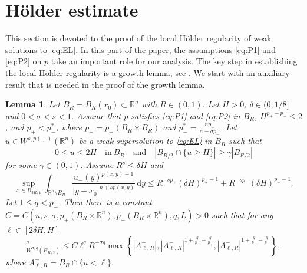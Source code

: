\documentclass[11pt]{amsart}
\theoremstyle{plain}
\newtheorem{lemma}[theorem]{Lemma}
\theoremstyle{definition}
\numberwithin{equation}{section}
\begin{document}
\section{H\"older estimate} \label{sec:Holder}
This section is devoted to the proof of the local H\"older regularity of weak solutions to \eqref{eq:EL}. In this part of the paper, the assumptions \eqref{eq:P1} and \eqref{eq:P2} on $p$ take an important role for our analysis. The key step in establishing the local H\"older regularity is a growth lemma, see . We start with an auxiliary result that is needed in the proof of the growth lemma. 
\begin{lemma} \label{lemma:ellest}
Let $B_R = B_R(x_0) \subset \mathbb{R}^n$ with $R \in (0,1)$. Let $H > 0$, $\delta\in(0,1/8]$ and $0<\sigma < s <1$. Assume that $p$ satisfies \eqref{eq:P1} and \eqref{eq:P2} in $B_R$, $H^{p_+ - p_-} \leq 2$, and $p_+ < p_-^\ast$, where $p_\pm = p_\pm(B_R \times B_R)$ and $p_-^\ast = \frac{np_-}{n-\sigma p_-}$. Let $u \in W^{s, p(\cdot,\cdot)}(\mathbb{R}^n)$ be a weak supersolution to \eqref{eq:EL} in $B_R$ such that
\begin{equation} \label{eq:assumption1}
0 \leq u \leq 2H \quad\text{in}~ B_R \quad\text{and}\quad |B_{R/2} \cap \lbrace u \geq H \rbrace| \geq \gamma |B_{R/2}|
\end{equation}
for some $\gamma \in (0,1)$. Assume $R^s \leq \delta H$ and
\begin{equation} \label{eq:assumption_tail2}
\sup_{x \in B_{3R/4}} \int_{\mathbb{R}^n \setminus B_R} \frac{u_-(y)^{p(x,y)-1}}{|y-x_0|^{n+sp(x,y)}} \,\mathrm{d}y \leq R^{-sp_+} (\delta H)^{p_+-1} + R^{-sp_-} (\delta H)^{p_--1}.
\end{equation}
Let $1 \leq q < p_- $.
Then there is a constant $C=C(n, s, \sigma, p_+(B_R \times \mathbb{R}^n), p_-(B_R \times \mathbb{R}^n), q, L) > 0$ such that for any $\ell\in[2\delta H,  H]$
\begin{equation*}
[(u-\ell)_{-}]_{W^{\sigma,q}(B_{R/2})}^q \leq C \ell^q R^{-\sigma q} \max \left\lbrace |A_{\ell, R}^-|, |A_{\ell, R}^-|^{1+\frac{q}{p_-}-\frac{q}{p_+}}, |A_{\ell, R}^-|^{1+\frac{q}{p_+} - \frac{q}{p_-}} \right\rbrace,
\end{equation*}
where $A_{\ell, R}^- = B_R \cap \lbrace u < \ell \rbrace$.
\end{lemma}
\end{document}
